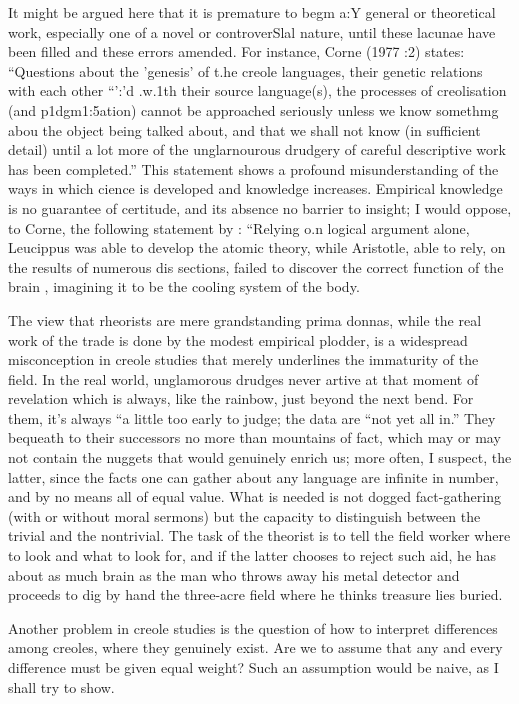 It might be argued here that it is premature to begm a:{\textquotedbl}Y general or theoretical work, especially one of a novel or controverSlal nature, until these lacunae have been filled and these errors amended. For instance, Corne (1977 :2) states: ``Questions about the 'genesis' of t.he creole languages, their genetic relations with each other ``':'d .w.1th their source language(s), the processes of creolisation (and p1dgm1:5a\-tion) cannot be approached seriously unless we know somethmg abou the object being talked about, and that we shall not know (in sufficient detail) until a lot more of the unglarnourous drudgery of careful descriptive work has been completed.'' This statement shows a profound misunderstanding of the ways in which cience is developed and knowledge increases. Empirical knowledge is no guarantee of certitude, and its absence no barrier to insight; I would oppose, to Corne, the following statement by \citet[3]{Dingwall1979}: ``Relying o.n logical argument alone, Leucippus was able to develop the atomic theory, while Aristotle, able to rely, on the results of numerous dis%
sections, failed to discover the correct function of the brain , imagining it to be the cooling system of the body.{\textquotedbl}

The view that rheorists are mere grandstanding prima donnas, while the real work of the trade is done by the modest empirical plodder, is a widespread misconception in creole studies that merely underlines the immaturity of the field. In the real world, unglamorous drudges never artive at that moment of revelation which is always, like the rainbow, just beyond the next bend. For them, it's always ``a little too early to judge{\textquotedbl}; the data are ``not yet all in.'' They bequeath to their successors no more than mountains of fact, which may or may not contain the nuggets that would genuinely enrich us; more often, I suspect, the latter, since the facts one can gather about any language are infinite in number, and by no means all of equal value. What is needed is not dogged fact-gathering (with or without moral sermons) but the capacity to distinguish between the trivial and the nontrivial. The task of the theorist is to tell the field worker where to look and what to look for, and if the latter chooses to reject such aid, he has about as much brain as the man who throws away his metal detector and proceeds to dig by hand the three-acre field where he thinks treasure lies buried.

Another problem in creole studies is the question of how to interpret differences among creoles, where they genuinely exist. Are we to assume that any and every difference must be given equal weight? Such an assumption would be naive, as I shall try to show.

